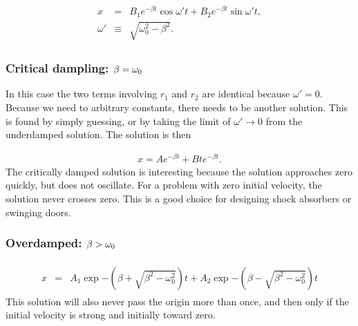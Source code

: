 \documentclass[letterpaper,10pt,english]{sphinxmanual}
\begin{document}
\begin{equation*}
\begin{split}
\begin{eqnarray}
\label{eq:homogsolution} \tag{9}
x&=&B_1e^{-\beta t}\cos\omega't+B_2e^{-\beta t}\sin\omega't,\\
\nonumber 
\omega'&\equiv&\sqrt{\omega_0^2-\beta^2}.
\end{eqnarray}
\end{split}
\end{equation*}

\subsubsection{Critical dampling: \protect\(\beta=\omega_0\protect\)}
\label{\detokenize{chapter4:critical-dampling-beta-omega-0}}
In this case the two terms involving \(r_1\) and \(r_2\) are identical
because \(\omega'=0\). Because we need to arbitrary constants, there
needs to be another solution. This is found by simply guessing, or by
taking the limit of \(\omega'\rightarrow 0\) from the underdamped
solution. The solution is then




\begin{equation*}
\begin{split}
\begin{equation}
\label{eq:criticallydamped} \tag{10}
x=Ae^{-\beta t}+Bte^{-\beta t}.
\end{equation}
\end{split}
\end{equation*}
The critically damped solution is interesting because the solution
approaches zero quickly, but does not oscillate. For a problem with
zero initial velocity, the solution never crosses zero. This is a good
choice for designing shock absorbers or swinging doors.


\subsubsection{Overdamped: \protect\(\beta>\omega_0\protect\)}
\label{\detokenize{chapter4:overdamped-beta-omega-0}}\begin{equation*}
\begin{split}
\begin{eqnarray}
x&=&A_1\exp{-(\beta+\sqrt{\beta^2-\omega_0^2})t}+A_2\exp{-(\beta-\sqrt{\beta^2-\omega_0^2})t}
\end{eqnarray}
\end{split}
\end{equation*}
This solution will also never pass the origin more than once, and then
only if the initial velocity is strong and initially toward zero.
\end{document}
